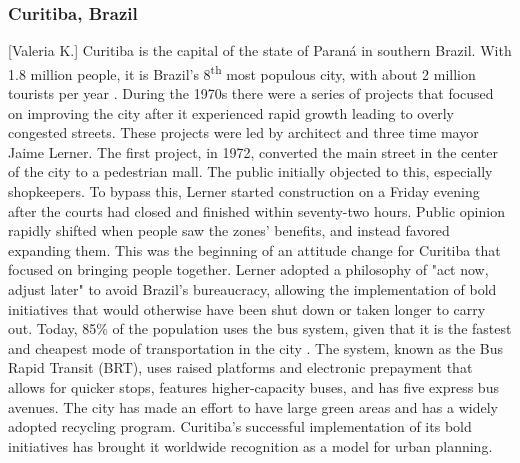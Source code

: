 \documentclass[12pt]{article}                               %
\begin{document}
\subsubsection{Curitiba, Brazil}[Valeria K.]
Curitiba is the capital of the state of Paraná in southern Brazil. With 1.8 million people, it is Brazil's 8\textsuperscript{th} most populous city, with about 2 million tourists per year \cite{Adler2016StoryCapital}. During the 1970s there were a series of projects that focused on improving the city after it experienced rapid growth leading to overly congested streets. These projects were led by architect and three time mayor Jaime Lerner. The first project, in 1972, converted the main street in the center of the city to a pedestrian mall. The public initially objected to this, especially shopkeepers. To bypass this, Lerner started construction on a Friday evening after the courts had closed and finished within seventy-two hours. Public opinion rapidly shifted when people saw the zones' benefits, and instead favored expanding them. This was the beginning of an attitude change for Curitiba that focused on bringing people together. Lerner adopted a philosophy of "act now, adjust later" to avoid Brazil's bureaucracy, allowing the implementation of bold initiatives that would otherwise have been shut down or taken longer to carry out. Today, 85\% of the population uses the bus system, given that it is the fastest and cheapest mode of transportation in the city \cite{Adler2016StoryCapital}. The system, known as the Bus Rapid Transit (BRT), uses raised platforms and electronic prepayment that allows for quicker stops, features higher-capacity buses, and has five express bus avenues. The city has made an effort to have large green areas and has a widely adopted recycling program. Curitiba's successful implementation of its bold initiatives has brought it worldwide recognition as a model for urban planning.
\end{document}
